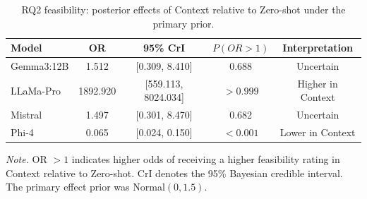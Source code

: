 \begin{table}[tbp]
\caption{RQ2 feasibility: posterior effects of Context relative to Zero-shot under the primary prior.}
\label{tab:rq2_feasibility_bayesian}
\begin{tabular}{lcccc}
\toprule
Model & OR & 95\% CrI & $P(OR>1)$ & Interpretation \\
\midrule
Gemma3:12B & 1.512 & [0.309, 8.410] & 0.688 & Uncertain \\
LLaMa-Pro & 1892.920 & [559.113, 8024.034] & $>0.999$ & Higher in Context \\
Mistral & 1.497 & [0.301, 8.470] & 0.682 & Uncertain \\
Phi-4 & 0.065 & [0.024, 0.150] & $<0.001$ & Lower in Context \\
\bottomrule
\end{tabular}
\vspace{2pt}
\begin{minipage}{\linewidth}
\footnotesize\textit{Note.} OR $>1$ indicates higher odds of receiving a higher feasibility rating in Context relative to Zero-shot. CrI denotes the 95\% Bayesian credible interval. The primary effect prior was Normal$(0,1.5)$.
\end{minipage}
\end{table}
